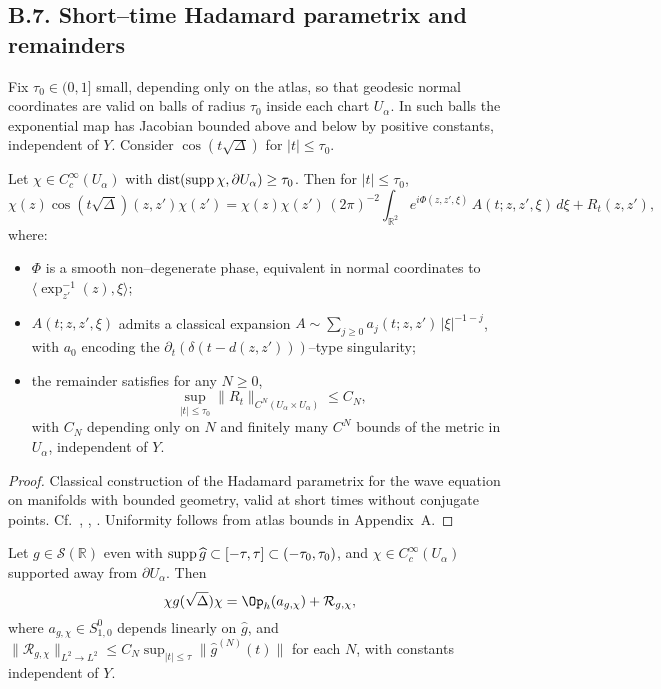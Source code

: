 \subsection*{B.7. Short–time Hadamard parametrix and remainders}
\label{subsec:B7-hadamard}

Fix $\tau_0\in(0,1]$ small, depending only on the atlas, so that geodesic normal
coordinates are valid on balls of radius $\tau_0$ inside each chart $U_\alpha$.
In such balls the exponential map has Jacobian bounded above and below by positive constants,
independent of $Y$. Consider $\cos(t\sqrt\Delta)$ for $|t|\le\tau_0$.

\begin{theorem}
\label{thm:B-hadamard}
Let $\chi\in C_c^\infty(U_\alpha)$ with $\operatorname{dist}(\operatorname{supp}\chi,\partial U_\alpha)\ge\tau_0$.
Then for $|t|\le\tau_0$,
\[
\chi(z)\cos(t\sqrt\Delta)(z,z')\chi(z')
=\chi(z)\chi(z')\,(2\pi)^{-2}\!\!\int_{\mathbb R^2}
e^{i\Phi(z,z',\xi)}\,A(t;z,z',\xi)\,d\xi + R_t(z,z'),
\]
where:
\begin{itemize}
  \item $\Phi$ is a smooth non–degenerate phase, equivalent in normal coordinates to
  $\langle\exp^{-1}_{z'}(z),\xi\rangle$;
  \item $A(t;z,z',\xi)$ admits a classical expansion
  $A\sim\sum_{j\ge0} a_j(t;z,z')\,|\xi|^{-1-j}$,
  with $a_0$ encoding the $\partial_t(\delta(t-d(z,z')))$–type singularity;
  \item the remainder satisfies for any $N\ge0$,
  \[
  \sup_{|t|\le\tau_0}\|R_t\|_{C^N(U_\alpha\times U_\alpha)}\le C_N,
  \]
  with $C_N$ depending only on $N$ and finitely many $C^N$ bounds of the metric in $U_\alpha$,
  independent of $Y$.
\end{itemize}
\end{theorem}

\begin{proof}
Classical construction of the Hadamard parametrix for the wave equation on manifolds
with bounded geometry, valid at short times without conjugate points.
Cf.\ \cite[Ch.~7]{HormanderI}, \cite[§5]{Sogge}, \cite[§11]{Zworski}.
Uniformity follows from atlas bounds in Appendix~A.
\end{proof}

\begin{corollary}
\label{cor:B-window}
Let $g\in\mathcal S(\mathbb R)$ even with $\operatorname{supp}\widehat g\subset[-\tau,\tau]\subset(-\tau_0,\tau_0)$,
and $\chi\in C_c^\infty(U_\alpha)$ supported away from $\partial U_\alpha$. Then
\[
\chi g(\sqrt\Delta)\chi = \Op_h(a_{g,\chi}) + \mathcal R_{g,\chi},
\]
where $a_{g,\chi}\in S^0_{1,0}$ depends linearly on $\widehat g$, and
$\|\mathcal R_{g,\chi}\|_{L^2\to L^2}\le C_N \sup_{|t|\le\tau}\|\widehat g^{(N)}(t)\|$
for each $N$, with constants independent of $Y$.
\end{corollary}

